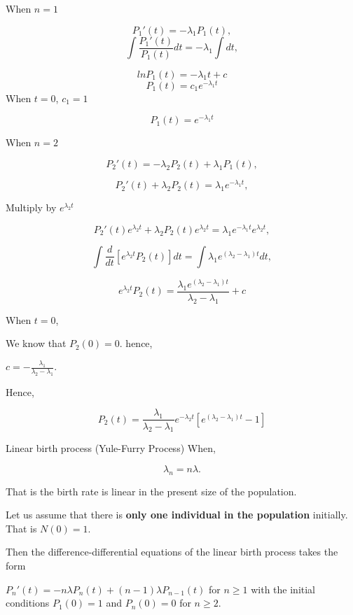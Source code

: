 \documentclass[12pt,ignorenonframetext,]{beamer}
\begin{document}
\begin{frame}
When \(n=1\)

\[P_1'(t) = -\lambda_1P_1(t),\]
\[\int\frac{P_1'(t)}{P_1(t)}dt=-\lambda_1\int dt,\]

\[ln P_1(t) = -\lambda_1t + c\] \[P_1(t) = c_1e^{-\lambda_1 t}\] When
\(t=0\), \(c_1=1\)

\[P_1(t) = e^{-\lambda_1 t}\]
\end{frame}

\begin{frame}
When \(n=2\)

\[P_2'(t) = -\lambda_2P_2(t) + \lambda_1P_1(t),\]

\[P_2'(t)+\lambda_2P_2(t) = \lambda_1 e^{-\lambda_1 t},\]

Multiply by \(e^{\lambda_2t}\)

\[P_2'(t) e^{\lambda_2t}+\lambda_2P_2(t) e^{\lambda_2t} = \lambda_1 e^{-\lambda_1 t}e^{\lambda_2t},\]

\[\int \frac{d}{dt}[e^{\lambda_2 t} P_2(t)]dt= \int \lambda_1 e^{(\lambda_2 - \lambda_1)t}dt,\]

\[e^{\lambda_2 t}P_2(t) = \frac{\lambda_1 e^{(\lambda_2 - \lambda_1)t}}{\lambda_2 - \lambda_1} + c\]
\end{frame}

\begin{frame}
When \(t=0\),

We know that \(P_2(0) = 0\). hence,

\(c=-\frac{\lambda_1}{\lambda_2 - \lambda_1}.\)

Hence,

\[P_2(t) = \frac{\lambda_1}{\lambda_2 - \lambda_1}e^{-\lambda_2t}[e^{(\lambda_2 - \lambda_1)t}-1]\]
\end{frame}

\begin{frame}{Linear birth process (Yule-Furry Process)}
\protect\hypertarget{linear-birth-process-yule-furry-process-1}{}
When,

\[\lambda_n = n\lambda.\]

That is the birth rate is linear in the present size of the population.

Let us assume that there is \textbf{only one individual in the
population} initially. That is \(N(0)=1\).

Then the difference-differential equations of the linear birth process
takes the form

\(P_n'(t) = -n\lambda P_n(t) + (n-1) \lambda P_{n-1}(t)\) for
\(n \geq 1\) with the initial conditions \(P_1(0)=1\) and \(P_n(0) = 0\)
for \(n \geq 2\).
\end{frame}
\end{document}

